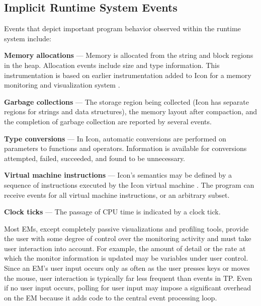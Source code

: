 \subsection*{Implicit Runtime System Events}

Events that depict important program behavior observed within the runtime
system include:

\begin{list}{}{\itemsep 7pt} %
\item [{\bf Memory allocations}] --- Memory is allocated from the
	string and block regions in the heap.  Allocation events
	include size and type information.
	This instrumentation is based on earlier instrumentation added to Icon
	for a memory monitoring and visualization system \cite{Town89}.

\item [{\bf Garbage collections}] --- The storage region being
	collected (Icon has separate regions for strings and data
	structures), the memory layout after compaction, and the
	completion of garbage collection are reported by several events.
\item [{\bf Type conversions}] --- In Icon, automatic conversions are
	performed on parameters	to functions and
	operators.  Information is available for conversions
	attempted, failed, succeeded, and found to be unnecessary.
\item [{\bf Virtual machine instructions}] --- Icon's semantics may be
	defined by a sequence of instructions executed by the Icon virtual
	machine \cite{Gris86}.  The program can receive events for
	all virtual machine instructions, or an arbitrary subset.
\item [{\bf Clock ticks}] --- The  passage of CPU time
	is indicated by a clock tick.
\end{list}


Most EMs, except completely passive visualizations and profiling
tools, provide the user with some degree of control over the
monitoring activity and must take user interaction into account.
For example, the amount of detail or the rate at which the monitor
information is updated may be variables under user control.  Since
an EM's user input occurs only as often as the user presses keys or
moves the mouse, user interaction is typically far less frequent than
events in TP.  Even if no user input occurs, polling for user input
may impose a significant overhead on the EM because it adds code to
the central event processing loop.

